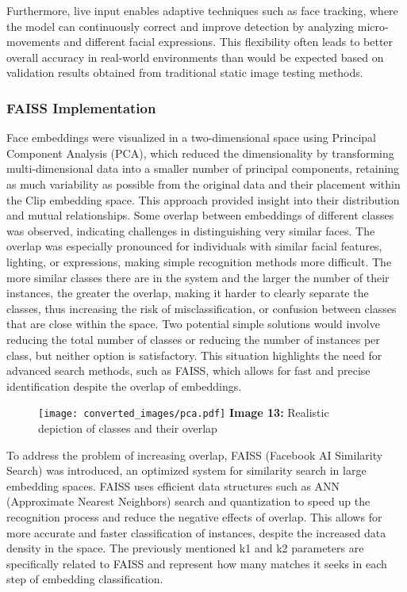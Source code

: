 \documentclass{article}
\begin{document}
\hspace*{1.00cm}Furthermore, live input enables adaptive techniques such as face tracking, where the model can continuously correct and improve detection by analyzing micro-movements and different facial expressions. This flexibility often leads to better overall accuracy in real-world environments than would be expected based on validation results obtained from traditional static image testing methods.

\subsubsection*{FAISS Implementation}
\hspace*{1.00cm}Face embeddings were visualized in a two-dimensional space using Principal Component Analysis (PCA)\cite{lever2017pca}, which reduced the dimensionality by transforming multi-dimensional data into a smaller number of principal components, retaining as much variability as possible from the original data and their placement within the Clip embedding space. This approach provided insight into their distribution and mutual relationships. Some overlap between embeddings of different classes was observed, indicating challenges in distinguishing very similar faces. The overlap was especially pronounced for individuals with similar facial features, lighting, or expressions, making simple recognition methods more difficult. The more similar classes there are in the system and the larger the number of their instances, the greater the overlap, making it harder to clearly separate the classes, thus increasing the risk of misclassification, or confusion between classes that are close within the space. Two potential simple solutions would involve reducing the total number of classes or reducing the number of instances per class, but neither option is satisfactory. This situation highlights the need for advanced search methods, such as FAISS, which allows for fast and precise identification despite the overlap of embeddings.

\begin{figure}[H]
    \centering
    \texttt{[image: converted\_images/pca.pdf]}
    \textbf{Image 13:} Realistic depiction of classes and their overlap
\end{figure}

\hspace*{1.00cm}To address the problem of increasing overlap, FAISS (Facebook AI Similarity Search) was introduced, an optimized system for similarity search in large embedding spaces. FAISS uses efficient data structures such as ANN (Approximate Nearest Neighbors) search and quantization to speed up the recognition process and reduce the negative effects of overlap. This allows for more accurate and faster classification of instances, despite the increased data density in the space. The previously mentioned k1 and k2 parameters are specifically related to FAISS and represent how many matches it seeks in each step of embedding classification.
\end{document}
